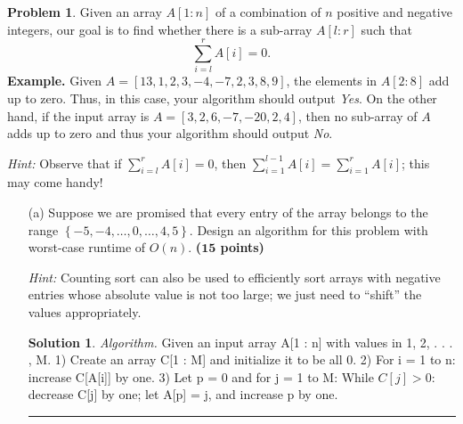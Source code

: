 \documentclass{article}
\theoremstyle{definition}
\newtheorem{problem}{Problem}
\def\fline{\rule{0.75\linewidth}{0.5pt}}
\newcommand{\finishline}{\begin{center}\fline\end{center}}
\newtheorem*{solution*}{Solution}
\newenvironment{solution}{\begin{solution*}}{{\finishline} \end{solution*}}
\newcommand{\grade}[1]{\hfill{\textbf{($\mathbf{#1}$ points)}}}
\newcommand{\set}[1]{\ensuremath{\left\{ #1 \right\}}}
\begin{document}
\smallskip

\begin{problem}
Given an array $A[1:n]$ of a combination of $n$ positive and negative integers, our goal is to find whether there is a sub-array $A[l:r]$ such that
\[
    \sum_{i=l}^r A[i] = 0.
\]
\textbf{Example.} Given $A = [13,1,2,3,-4,-7,2,3,8,9]$, the elements in $A[2:8]$ add up to zero. Thus, in this case, your algorithm should output \emph{Yes}. 
On the other hand, if the input array is $A = [3,2,6,-7,-20,2,4]$, then no sub-array of $A$ adds up to zero and thus your algorithm should output \emph{No}. 

\emph{Hint:} Observe that if $\sum_{i=l}^r A[i] = 0$, then $\sum_{i=1}^{l-1} A[i] = \sum_{i=1}^{r} A[i]$; this may come handy! 

\begin{enumerate}
\item[(a)] Suppose we are promised that every entry of the array belongs to the range $\set{-5,-4,\ldots,0,\ldots,4,5}$. Design an algorithm for this problem with worst-case  runtime of $O(n)$. \grade{15}

\emph{Hint:} Counting sort can also be used to efficiently sort arrays with negative entries whose absolute value is not too large; we just need to ``shift'' the values appropriately. 


	\begin{solution}
		
		\emph{Algorithm.} Given an input array A[1 : n] with values in {1, 2, . . . , M}. 1) Create an array C[1 : M] and initialize it to be all 0. 2) For i = 1 to n: increase C[A[i]] by one. 3) Let p = 0 and for j = 1 to M: While $C[j] > 0$: decrease C[j] by one; let A[p] = j, and increase p by one. \\
		

\end{solution}
\end{enumerate}
\end{problem}
\end{document}
